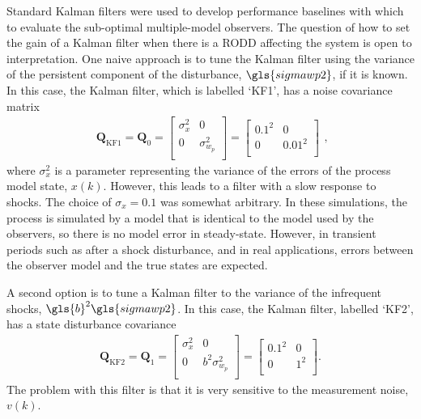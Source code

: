 Standard Kalman filters were used to develop performance baselines with which to evaluate the sub-optimal multiple-model observers. The question of how to set the gain of a Kalman filter when there is a \gls{RODD} affecting the system is open to interpretation. One naive approach is to tune the Kalman filter using the variance of the persistent component of the disturbance, $\gls{sigmawp2}$, if it is known. In this case, the Kalman filter, which is labelled `KF1', has a noise covariance matrix
\begin{equation} \label{eq:sim-sys-siso-KF1-Q}
	\begin{aligned}
		\mathbf{Q}_{\text{KF1}}=\mathbf{Q}_0=\begin{bmatrix}
			\sigma_{x}^2 & 0 \\
			0 &  \sigma_{w_p}^2 \\
		\end{bmatrix}=\begin{bmatrix}
		0.1^2 & 0 \\
		0 & 0.01^2 \\
	\end{bmatrix}
	\end{aligned},
\end{equation}
where $\sigma_{x}^2$ is a parameter representing the variance of the errors of the process model state, $x(k)$. However, this leads to a filter with a slow response to shocks. The choice of $\sigma_{x}=0.1$ was somewhat arbitrary. In these simulations, the process is simulated by a model that is identical to the model used by the observers, so there is no model error in steady-state. However, in transient periods such as after a shock disturbance, and in real applications, errors between the observer model and the true states are expected.

A second option is to tune a Kalman filter to the variance of the infrequent shocks, $\gls{b}^2\gls{sigmawp2}$.  In this case, the Kalman filter, labelled `KF2', has a state disturbance covariance
\begin{equation} \label{eq:sim-sys-siso-KF2-Q}
	\begin{aligned}
		\mathbf{Q}_{\text{KF2}}=\mathbf{Q}_1=\begin{bmatrix}
			\sigma_{x}^2 & 0 \\
			0 & b^2\sigma_{w_p}^2 \\
		\end{bmatrix}=\begin{bmatrix}
			0.1^2 & 0 \\
			0 & 1^2 \\
		\end{bmatrix}.
	\end{aligned}
\end{equation}
The problem with this filter is that it is very sensitive to the measurement noise, $v(k)$. 

